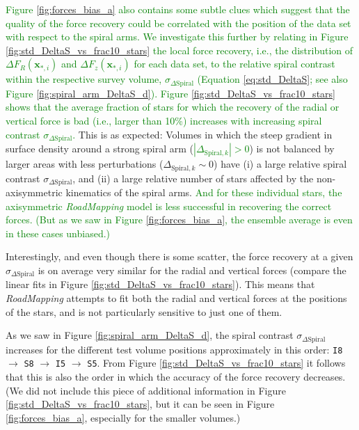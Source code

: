 \documentclass[iop,revtex4,numberedappendix,appendixfloats]{emulateapj}
\newcommand{\vect}[1]{\boldsymbol{#1}}
\newcommand{\RM}{{\sl RoadMapping}}
\newcommand{\NEW}[1]{\textcolor{Green}{#1}}
\newcommand{\OLD}[1]{}
\begin{document}
\NEW{Figure \ref{fig:forces_bias_a} also contains some subtle clues which suggest that the quality of the force recovery could be correlated with the position of the data set with respect to the spiral arms. We investigate this further by relating in Figure \ref{fig:std_DeltaS_vs_frac10_stars} the local force recovery, i.e., the distribution of $\Delta F_R(\vect{x}_{*,i})$ and $\Delta F_z(\vect{x}_{*,i})$ for each data set, to the relative spiral contrast within the respective survey volume, $\sigma_{\Delta \text{Spiral}}$ (Equation \eqref{eq:std_DeltaS}; see also Figure \ref{fig:spiral_arm_DeltaS_d}). Figure \ref{fig:std_DeltaS_vs_frac10_stars} shows that the average fraction of stars for which the recovery of the radial or vertical force is bad (i.e., larger than 10\%) increases with increasing spiral contrast $\sigma_{\Delta\text{Spiral}}$.} This is as expected: Volumes in which the steep gradient in surface density around a strong spiral arm (\OLD{$\Delta_{\text{Spiral},k} \neq 0$}\NEW{$|\Delta_{\text{Spiral},k}| > 0$}) is not balanced by larger areas with less perturbations ($\Delta_{\text{Spiral},k} \sim 0$) have (i) a large relative spiral contrast $\sigma_{\Delta\text{Spiral}}$, and (ii) a large relative number of stars affected by the non-axisymmetric kinematics of the spiral arms. \NEW{And for these individual stars, the axisymmetric \RM{} model is less successful in recovering the correct forces. (But as we saw in Figure \ref{fig:forces_bias_a}, the ensemble average is even in these cases unbiased.)} 

Interestingly, and even though there is some scatter, the force recovery at a given $\sigma_{\Delta\text{Spiral}}$ is on average very similar for the radial and vertical forces (compare the linear fits in Figure \ref{fig:std_DeltaS_vs_frac10_stars}). This means that \RM{} attempts to fit both the radial and vertical forces at the positions of the stars, and is not particularly sensitive to just one of them.

As we saw in Figure \ref{fig:spiral_arm_DeltaS_d}, the spiral contrast $\sigma_{\Delta \text{Spiral}}$ increases for the different test volume positions approximately in this order: \texttt{I8} $\longrightarrow$ \texttt{S8} $\longrightarrow$ \texttt{I5} $\longrightarrow$ \texttt{S5}. From Figure \ref{fig:std_DeltaS_vs_frac10_stars} it follows that this is also the order in which the accuracy of the force recovery decreases. (We did not include this piece of additional information in Figure \ref{fig:std_DeltaS_vs_frac10_stars}, but it can be seen in Figure \ref{fig:forces_bias_a}, especially for the smaller volumes.)
\end{document}
